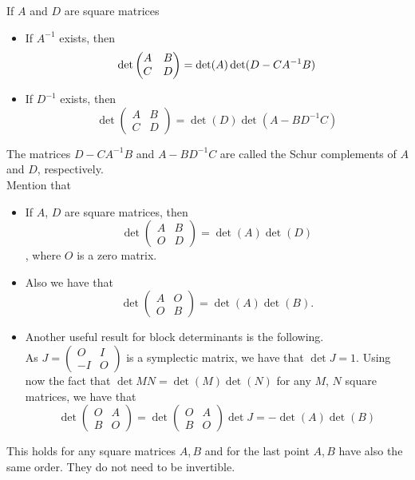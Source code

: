 \documentclass[12pt]{article}
\begin{document}
If $A$ and $D$ are square matrices
\begin{itemize}
\item If $A^{-1}$ exists, then $$ \det \begin{pmatrix} A & B \\ C & D \end{pmatrix}=\det(A)\det(D-CA^{-1}B)\\$$  
\item If $D^{-1}$ exists, then $$\det \begin{pmatrix} A & B \\ C & D \end{pmatrix}=\det(D)\det(A-BD^{-1}C)$$
\end{itemize}
The matrices $D-CA^{-1}B$ and $A-BD^{-1}C$ are called the Schur complements of $A$ and $D$, respectively.
\\Mention that 
\begin{itemize}
\item If $A$, $D$ are square matrices, then  
$$ \det \begin{pmatrix} A & B \\ O & D \end{pmatrix}=\det(A) \det(D)$$, where $O$ is a zero matrix.
\item Also we have that $$\det \begin{pmatrix} A & O \\ O & B \end{pmatrix}=\det(A)\det(B).$$ 
\item Another useful result for block determinants is the following.
\\As $J=\begin{pmatrix} O & I \\ -I & O \end{pmatrix}$ is a symplectic matrix, 
we have that $\det J=1$. Using now the fact that $\det MN= \det(M) \det(N)$ for any $M$, $N$ square matrices, we have that
$$ \det \begin{pmatrix} O & A \\ B & O \end{pmatrix}
=\det \begin{pmatrix} O & A \\ B & O \end{pmatrix}\det J
=-\det(A)\det(B)$$
\end{itemize}
This holds for any square matrices $A$,\,$B$ and for the last point $A$,\,$B$ have also the same order. They do not need to be
invertible.
\end{document}

